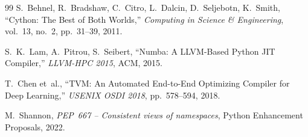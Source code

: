 ﻿\documentclass[a4paper,12pt]{scrreprt}
\theoremstyle{definition}
\begin{document}
\begin{thebibliography}{99}
		S.~Behnel, R.~Bradshaw, C.~Citro, L.~Dalcin, D.~Seljebotn, K.~Smith,
		``Cython: The Best of Both Worlds,''
		\textit{Computing in Science \& Engineering}, vol.~13, no.~2, pp.~31--39,
		2011.
		
		S.~K.~Lam, A.~Pitrou, S.~Seibert,
		``Numba: A LLVM-Based Python JIT Compiler,''
		\textit{LLVM-HPC 2015}, ACM, 2015.
		
		T.~Chen et~al.,
		``TVM: An Automated End-to-End Optimizing Compiler for Deep Learning,''
		\textit{USENIX OSDI 2018}, pp.~578--594, 2018.
		
		M.~Shannon,
		\textit{PEP~667 -- Consistent views of namespaces},
		Python Enhancement Proposals, 2022.
		
	\end{thebibliography}
	
\end{document}
